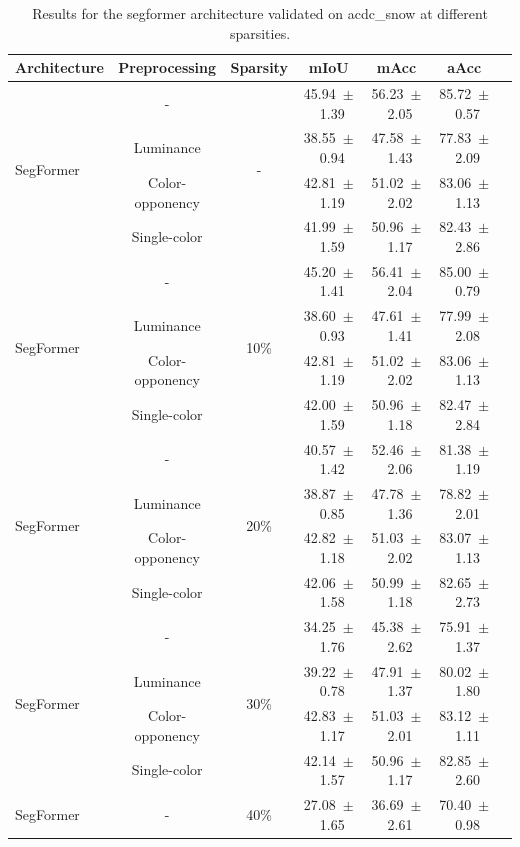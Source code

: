 \begin{table}[h]
\centering
\caption{Results for the segformer architecture validated on acdc_snow at different sparsities.}
\begin{tabular}{@{}lccc ccc@{}}
\toprule
Architecture & Preprocessing & Sparsity & mIoU & mAcc & aAcc \\
\midrule

\multirow{4}{*}{SegFormer} & - & \multirow{4}{*}{-} & 45.94~$\pm$~1.39 & 56.23~$\pm$~2.05 & 85.72~$\pm$~0.57 \\
& Luminance & & 38.55~$\pm$~0.94 & 47.58~$\pm$~1.43 & 77.83~$\pm$~2.09 \\
& Color-opponency & & 42.81~$\pm$~1.19 & 51.02~$\pm$~2.02 & 83.06~$\pm$~1.13 \\
& Single-color & & 41.99~$\pm$~1.59 & 50.96~$\pm$~1.17 & 82.43~$\pm$~2.86 \\
\midrule
\multirow{4}{*}{SegFormer} & - & \multirow{4}{*}{10\%} & 45.20~$\pm$~1.41 & 56.41~$\pm$~2.04 & 85.00~$\pm$~0.79 \\
& Luminance & & 38.60~$\pm$~0.93 & 47.61~$\pm$~1.41 & 77.99~$\pm$~2.08 \\
& Color-opponency & & 42.81~$\pm$~1.19 & 51.02~$\pm$~2.02 & 83.06~$\pm$~1.13 \\
& Single-color & & 42.00~$\pm$~1.59 & 50.96~$\pm$~1.18 & 82.47~$\pm$~2.84 \\
\midrule
\multirow{4}{*}{SegFormer} & - & \multirow{4}{*}{20\%} & 40.57~$\pm$~1.42 & 52.46~$\pm$~2.06 & 81.38~$\pm$~1.19 \\
& Luminance & & 38.87~$\pm$~0.85 & 47.78~$\pm$~1.36 & 78.82~$\pm$~2.01 \\
& Color-opponency & & 42.82~$\pm$~1.18 & 51.03~$\pm$~2.02 & 83.07~$\pm$~1.13 \\
& Single-color & & 42.06~$\pm$~1.58 & 50.99~$\pm$~1.18 & 82.65~$\pm$~2.73 \\
\midrule
\multirow{4}{*}{SegFormer} & - & \multirow{4}{*}{30\%} & 34.25~$\pm$~1.76 & 45.38~$\pm$~2.62 & 75.91~$\pm$~1.37 \\
& Luminance & & 39.22~$\pm$~0.78 & 47.91~$\pm$~1.37 & 80.02~$\pm$~1.80 \\
& Color-opponency & & 42.83~$\pm$~1.17 & 51.03~$\pm$~2.01 & 83.12~$\pm$~1.11 \\
& Single-color & & 42.14~$\pm$~1.57 & 50.96~$\pm$~1.17 & 82.85~$\pm$~2.60 \\
\midrule
\multirow{4}{*}{SegFormer} & - & \multirow{4}{*}{40\%} & 27.08~$\pm$~1.65 & 36.69~$\pm$~2.61 & 70.40~$\pm$~0.98 \\

\end{tabular}
\end{table}
